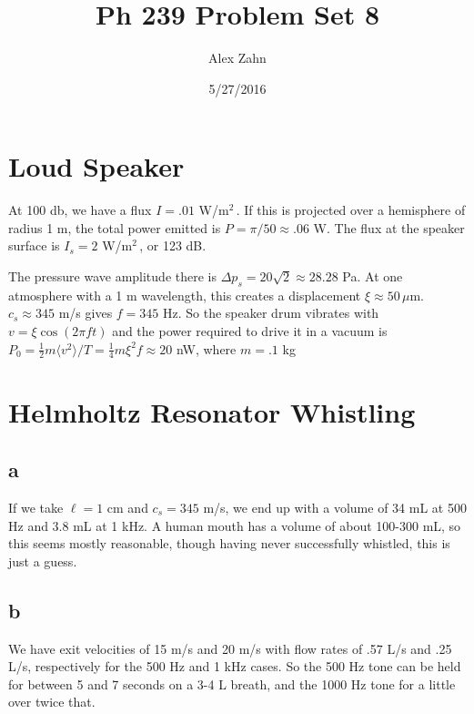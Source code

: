 \documentclass[12pt]{article}
\title{Ph 239 Problem Set 8}
\author{Alex Zahn}
\date{5/27/2016}
\begin{document}
\maketitle

\newcommand{\wmsq}{W/\(\mathrm{m}^2\,\)}
\newcommand{\msq}{\(\mathrm{m}^2\,\)}
\newcommand{\micron}{\(\mu\mathrm{m}\)\,}
\newcommand{\mcb}{\(\mathrm{m}^3\,\)}


\section{Loud Speaker}

At 100 db, we have a flux \(I = .01 \)  \wmsq. If this is projected over a hemisphere of radius 1 m, the total power emitted is \(P = \pi/50 \approx .06\) W. The flux at the speaker surface is \(I_s = 2\) \wmsq, or 123 dB.

The pressure wave amplitude there is \(\Delta p_s = 20\sqrt{2} \approx 28.28\) Pa. At one atmosphere with a 1 m wavelength, this creates a displacement \(\xi \approx 50 \, \mu\)m. \(c_s \approx 345\) m/s  gives \(f = 345\) Hz. So the speaker drum vibrates with \(v = \xi \cos(2\pi ft)\) and the power required to drive it in a vacuum is \(P_0 = \frac{1}{2}m \langle v^2 \rangle/T = \frac{1}{4}m\xi^2 f \approx 20  \) nW, where \(m = .1\) kg



\section{Helmholtz Resonator Whistling}

\subsection*{a}

If we take \(\ell = 1\) cm and \(c_s = 345\) m/s, we end up with a volume of 34 mL at 500 Hz and 3.8 mL at 1 kHz. A human mouth has a volume of about 100-300 mL, so this seems mostly reasonable, though having never successfully whistled, this is just a guess.

\subsection*{b}

We have exit velocities of 15 m/s and 20 m/s with flow rates of .57 L/s and .25 L/s, respectively for the 500 Hz and 1 kHz cases. So the 500 Hz tone can be held for between 5 and 7 seconds on a 3-4 L breath, and the 1000 Hz tone for a little over twice that.
\end{document}
